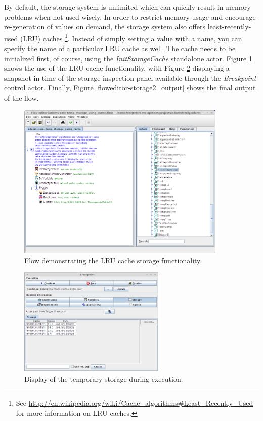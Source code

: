 By default, the storage system is unlimited which can quickly result in memory
problems when not used wisely. In order to restrict memory usage and encourage
re-generation of values on demand, the storage system also offers
least-recently-used (LRU) caches \footnote{See
\url{http://en.wikipedia.org/wiki/Cache_algorithms\#Least_Recently_Used}{} for
more information on LRU caches.}. Instead of simply setting a value with a name,
you can specify the name of a particular LRU cache as well. The cache needs to
be initialized first, of course, using the \textit{InitStorageCache} standalone
actor. Figure \ref{floweditor-storage2_flow} shows the use of the LRU cache
functionality, with Figure \ref{floweditor-storage2_inspectionpanel} displaying
a snapshot in time of the storage inspection panel available through the
\textit{Breakpoint} control actor. Finally, Figure
\ref{floweditor-storage2_output} shows the final output of the flow.

\begin{figure}[htb]
  \centering
  \includegraphics[width=10.0cm]{images/floweditor-storage2_flow.png}
  \caption{Flow demonstrating the LRU cache storage functionality.}
  \label{floweditor-storage2_flow}
\end{figure}

\begin{figure}[htb]
  \centering
  \includegraphics[width=7.0cm]{images/floweditor-storage2_inspectionpanel.png}
  \caption{Display of the temporary storage during execution.}
  \label{floweditor-storage2_inspectionpanel}
\end{figure}

